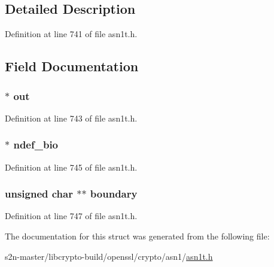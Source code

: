 \subsection{Detailed Description}


Definition at line 741 of file asn1t.\+h.



\subsection{Field Documentation}
\subsubsection[{\texorpdfstring{out}{out}}]{ $\ast$ out}\hypertarget{struct_a_s_n1___s_t_r_e_a_m___a_r_g__st_a05bc032abf108b32fc96d54922811784}{}\label{struct_a_s_n1___s_t_r_e_a_m___a_r_g__st_a05bc032abf108b32fc96d54922811784}


Definition at line 743 of file asn1t.\+h.

\subsubsection[{\texorpdfstring{ndef\+\_\+bio}{ndef_bio}}]{ $\ast$ ndef\+\_\+bio}\hypertarget{struct_a_s_n1___s_t_r_e_a_m___a_r_g__st_a02905dfadca023387ba4f340b68c49b4}{}\label{struct_a_s_n1___s_t_r_e_a_m___a_r_g__st_a02905dfadca023387ba4f340b68c49b4}


Definition at line 745 of file asn1t.\+h.

\subsubsection[{\texorpdfstring{boundary}{boundary}}]{\setlength{\rightskip}{0pt plus 5cm}unsigned char $\ast$$\ast$ boundary}\hypertarget{struct_a_s_n1___s_t_r_e_a_m___a_r_g__st_a0b7dcabcdeeb7470bc834c33eae75a09}{}\label{struct_a_s_n1___s_t_r_e_a_m___a_r_g__st_a0b7dcabcdeeb7470bc834c33eae75a09}


Definition at line 747 of file asn1t.\+h.



The documentation for this struct was generated from the following file\+:\begin{DoxyCompactItemize}
\item 
s2n-\/master/libcrypto-\/build/openssl/crypto/asn1/\hyperlink{crypto_2asn1_2asn1t_8h}{asn1t.\+h}\end{DoxyCompactItemize}
